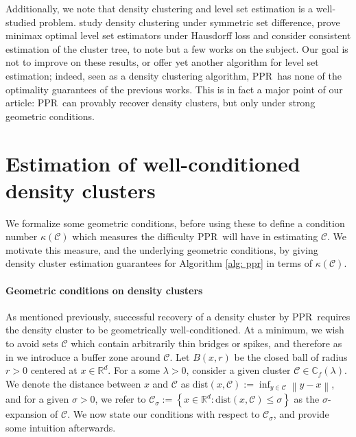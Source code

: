 \documentclass{article}
\newcommand{\set}[1]{\left\{#1\right\}}
\newcommand{\Reals}{\mathbb{R}}
\newcommand{\Rd}{\Reals^d}
\newcommand{\norm}[1]{\left\lVert#1\right\rVert}
\newcommand{\1}{\mathbf{1}}
\newcommand{\dist}{\mathrm{dist}}
\newcommand{\Cbb}{\mathbb{C}}
\newcommand{\Cset}{\mathcal{C}}
\newcommand{\Csig}{\Cset_{\sigma}}
\newcommand{\pprspace}{{\sc PPR~}}
\theoremstyle{aldenthm}
\theoremstyle{aldenrmrk}
\begin{document}
Additionally, we note that density clustering and level set estimation is a well-studied problem. \citep{polonik1995, rigollet2009} study density clustering under symmetric set difference, \citep{tsybakov1997, singh2009} prove minimax optimal level set estimators under Hausdorff loss and \citep{hartigan1981, chaudhuri2010} consider consistent estimation of the cluster tree, to note but a few works on the subject. Our goal is not to improve on these results, or offer yet another algorithm for level set estimation; indeed, seen as a density clustering algorithm, \pprspace has none of the optimality guarantees of the previous works. This is in fact a major point of our article: \pprspace can provably recover density clusters, but only under strong geometric conditions. 

\section{Estimation of well-conditioned density clusters}
\label{sec: consistent_cluster_estimation_with_ppr}

We formalize some geometric conditions, before using these to define a condition number $\kappa(\Cset)$ which measures the difficulty \pprspace will have in estimating $\Cset$. We motivate this measure, and the underlying geometric conditions, by giving density cluster estimation guarantees for Algorithm \ref{alg: ppr} in terms of $\kappa(\Cset)$.

\paragraph{Geometric conditions on density clusters}

As mentioned previously, successful recovery of a density cluster by \pprspace requires the density cluster to be geometrically well-conditioned. At a minimum, we wish to avoid sets $\Cset$ which contain arbitrarily thin bridges or spikes, and therefore as in \cite{chaudhuri2010} we introduce a buffer zone around $\Cset$. Let $B(x,r)$ be the closed ball of radius $r > 0$ centered at $x \in \Rd$. For a some $\lambda > 0$, consider a given cluster $\Cset \in \Cbb_f(\lambda)$. We denote the distance between $x$ and $\Cset$ as $\dist(x,\Cset) := \inf_{y \in \Cset} \norm{y - x}$, and for a given $\sigma > 0$, we refer to $\Csig := \set{x \in \Reals^d: \dist(x,\Cset) \leq \sigma}$ as the $\sigma$-expansion of $\Cset$. We now state our conditions with respect to $\Csig$, and provide some intuition afterwards.
\end{document}
